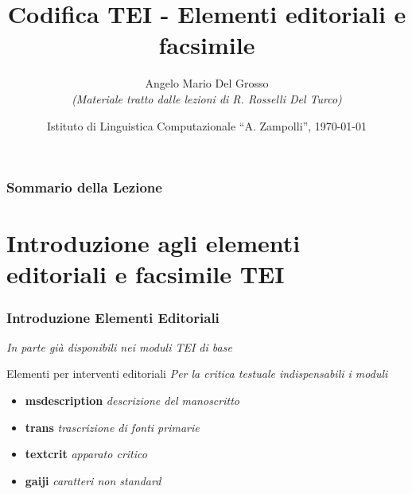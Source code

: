\documentclass{beamer}
\title{Codifica TEI - Elementi editoriali e facsimile}
\author[A.M. Del Grosso]{Angelo Mario Del Grosso \\ \tiny\textit{(Materiale tratto dalle lezioni di R. Rosselli Del Turco)}}
\institute{\texttt{angelo.delgrosso@ilc.cnr.it} \\\bigskip\textit{CNR-ILC-LicoLab} \\\url{http://licolab.ilc.cnr.it/}}
\date{Istituto di Linguistica Computazionale ``A. Zampolli'', \today}
\begin{document}
    
    \begin{frame}
        \maketitle
    \end{frame}
    
    \begin{frame}
        \frametitle{Sommario della Lezione}
        \tableofcontents
    \end{frame}
    
    \section{Introduzione agli elementi editoriali e facsimile TEI}
    
    \begin{frame}
        \frametitle{Introduzione Elementi Editoriali}
        \addtocounter{nframe}{1}
        
        \textit{In parte già disponibili nei moduli TEI di base}

        \begin{block}{Elementi per interventi editoriali}
            \emph{Per la critica testuale indispensabili i moduli}
            \begin{itemize}
                \item \textbf{msdescription} \textit{descrizione del manoscritto} 
                \item \textbf{trans} \textit{trascrizione di fonti primarie }
                \item \textbf{textcrit} \textit{apparato critico}
                \item \textbf{gaiji} \textit{caratteri non standard}
            \end{itemize}
        \end{block}
        
    \end{frame}
    
\end{document}
